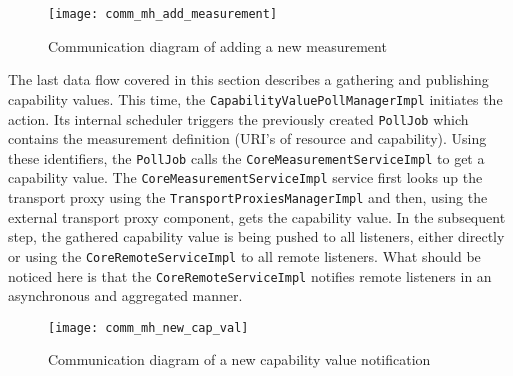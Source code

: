 \begin{figure}[ht]
\centering
\texttt{[image: comm\_mh\_add\_measurement]}
\caption{Communication diagram of adding a new measurement}
\label{fig:comm_mh_add_measurement}
\end{figure}

The last data flow covered in this section describes a gathering and publishing capability values. This time, the \texttt{CapabilityValuePollManagerImpl} initiates the action. Its internal scheduler triggers the previously created \texttt{PollJob} which contains the measurement definition (URI's of resource and capability). Using these identifiers, the \texttt{PollJob} calls the \texttt{CoreMeasurementServiceImpl} to get a capability value. The \texttt{CoreMeasurementServiceImpl} service first looks up the transport proxy using the \texttt{TransportProxiesManagerImpl} and then, using the external transport proxy component, gets the capability value. In the subsequent step, the gathered capability value is being pushed to all listeners, either directly or using the \texttt{CoreRemoteServiceImpl} to all remote listeners. What should be noticed here is that the \texttt{CoreRemoteServiceImpl} notifies remote listeners in an asynchronous and aggregated manner.

\begin{figure}[ht]
\centering
\texttt{[image: comm\_mh\_new\_cap\_val]}
\caption{Communication diagram of a new capability value notification}
\label{fig:comm_new_cap_val}
\end{figure}
\pagebreak
